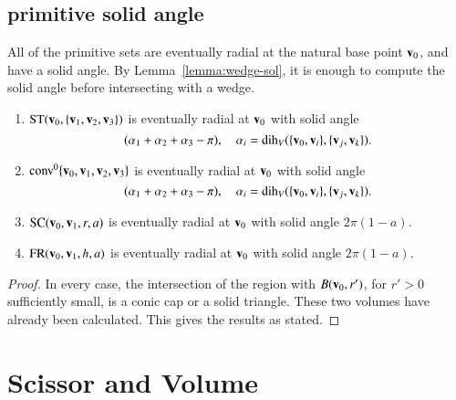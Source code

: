 \subsection{primitive solid angle}

All of the primitive sets are eventually radial at the natural
base point ${\mathbf v}_0$, and have a
solid angle.  By Lemma~\ref{lemma:wedge-sol}, it is enough to compute
the solid angle before intersecting with a wedge.
%

\begin{lemma} 
\begin{enumerate}
\item  ${\operatorname{ST}}({\mathbf v}_0,\{{\mathbf v}_1,{\mathbf v}_2,{\mathbf v}_3\})$ is eventually radial at ${\mathbf v}_0$
with solid angle 
\begin{displaymath}
(\alpha_1+\alpha_2+\alpha_3-\pi),\quad
\alpha_i=\operatorname{dih}_V(\{{\mathbf v}_0,{\mathbf v}_i\},\{{\mathbf v}_j,{\mathbf v}_k\}).
\end{displaymath}
\item ${\operatorname{conv}}^0\{{\mathbf v}_0,{\mathbf v}_1,{\mathbf v}_2,{\mathbf v}_3\}$ is eventually radial at ${\mathbf v}_0$
with solid angle
\begin{displaymath}
(\alpha_1+\alpha_2+\alpha_3-\pi),\quad
\alpha_i=\operatorname{dih}_V(\{{\mathbf v}_0,{\mathbf v}_i\},\{{\mathbf v}_j,{\mathbf v}_k\}).
\end{displaymath}
\item ${\operatorname{SC}}({\mathbf v}_0,{\mathbf v}_1,r,a)$ is eventually radial at ${\mathbf v}_0$ with solid
angle 
$2\pi(1-a)$.
\item ${\operatorname{FR}}({\mathbf v}_0,{\mathbf v}_1,h,a)$ is eventually radial at ${\mathbf v}_0$ with solid
angle        $2\pi (1-a)$.
%
\end{enumerate}
\end{lemma}
%

%
%
%
%

\begin{proof} In every case, the intersection of 
the region with $B({\mathbf v}_0,r')$, for $r'>0$ sufficiently small, is
a conic cap or a solid triangle.  These two volumes have
already been calculated.  This gives the results as stated.
\end{proof}


\section{Scissor and Volume}

